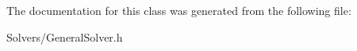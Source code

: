 The documentation for this class was generated from the following file\+:\begin{DoxyCompactItemize}
\item 
Solvers/General\+Solver.\+h\end{DoxyCompactItemize}
